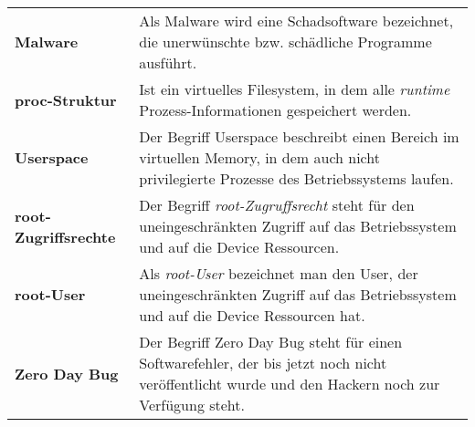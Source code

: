 \begin{table*}[htbp]
\begin{center}
\begin{tabular}{p{3cm}p{12cm}}
		  \textbf{Malware} &  Als Malware wird eine Schadsoftware bezeichnet, die unerwünschte bzw. schädliche Programme ausführt.\\
		 
		  \textbf{proc-Struktur} & Ist ein virtuelles Filesystem, in dem alle \textit{\glqq runtime\grqq{}} Prozess-Informationen gespeichert werden.\\
		  
		  \textbf{Userspace} & Der Begriff Userspace beschreibt einen Bereich im virtuellen Memory, in dem auch nicht privilegierte Prozesse des Betriebssystems laufen.\\
		  
		 \textbf{root-Zugriffsrechte} &  Der Begriff \textit{\glqq root-Zugruffsrecht\grqq{}} steht für den uneingeschränkten Zugriff auf das Betriebssystem und auf die Device Ressourcen.\\
		 \textbf{root-User} &  Als \textit{\glqq root-User\grqq{}} bezeichnet man den User, der uneingeschränkten Zugriff auf das Betriebssystem und auf die Device Ressourcen hat.\\ 
		 \textbf{Zero Day Bug} &  Der Begriff Zero Day Bug steht für einen Softwarefehler, der bis jetzt noch nicht veröffentlicht wurde und den Hackern noch zur Verfügung steht.\\
		  
		\end{tabular}		    
    \end{center}
\end{table*}
